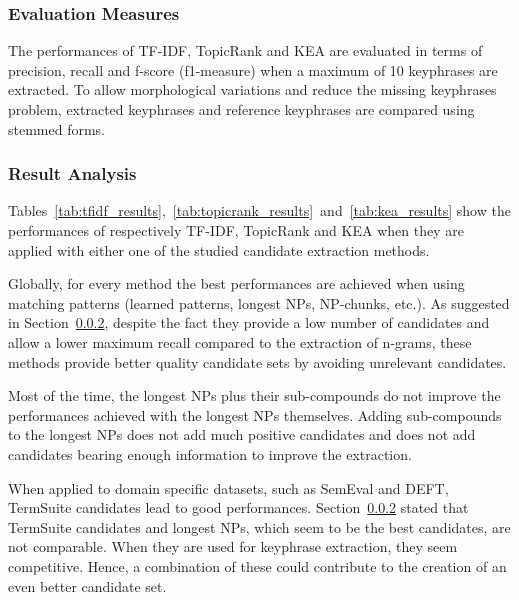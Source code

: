     \subsubsection{Evaluation Measures}
    \label{subsubsec:keyphrase_extraction_evaluation_measures}
      The performances of TF-IDF, TopicRank and KEA are evaluated in terms of
      precision, recall and f-score (f1-measure) when a maximum of 10 keyphrases
      are extracted. To allow morphological variations and reduce the missing
      keyphrases problem, extracted keyphrases and reference keyphrases are
      compared using stemmed forms.

    \subsubsection{Result Analysis}
    \label{subsubsec:candidate_extraction_result_analysis}
      Tables~\ref{tab:tfidf_results},~\ref{tab:topicrank_results}~and~\ref{tab:kea_results}
      show the performances of respectively TF-IDF, TopicRank and KEA when
      they are applied with either one of the studied candidate extraction
      methods.

      Globally, for every method the best performances are achieved when using
      matching patterns (learned patterns, longest NPs, NP-chunks, etc.). As
      suggested in Section~\ref{subsubsec:candidate_extraction_result_analysis},
      despite the fact they provide a low number of candidates and allow a lower
      maximum recall compared to the extraction of n-grams, these methods
      provide better quality candidate sets by avoiding unrelevant candidates.

      Most of the time, the longest NPs plus their sub-compounds do not improve
      the performances achieved with the longest NPs themselves. Adding
      sub-compounds to the longest NPs does not add much positive candidates and
      does not add candidates bearing enough information to improve the
      extraction.

      When applied to domain specific datasets, such as SemEval and DEFT,
      TermSuite candidates  lead to good performances.
      Section~\ref{subsubsec:candidate_extraction_result_analysis} stated that
      TermSuite candidates and longest NPs, which seem to be the best
      candidates, are not comparable. When they are used for keyphrase
      extraction, they seem competitive. Hence, a combination of these could
      contribute to the creation of an even better candidate set.

